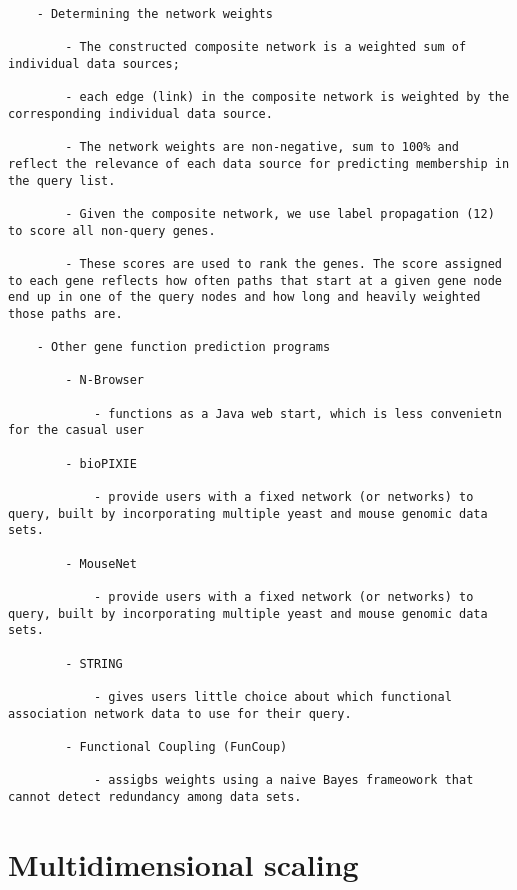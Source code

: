 \documentclass[
]{book}
\begin{document}
\begin{verbatim}
    - Determining the network weights

        - The constructed composite network is a weighted sum of individual data sources;

        - each edge (link) in the composite network is weighted by the corresponding individual data source.

        - The network weights are non-negative, sum to 100% and reflect the relevance of each data source for predicting membership in the query list.

        - Given the composite network, we use label propagation (12) to score all non-query genes.

        - These scores are used to rank the genes. The score assigned to each gene reflects how often paths that start at a given gene node end up in one of the query nodes and how long and heavily weighted those paths are.

    - Other gene function prediction programs

        - N-Browser

            - functions as a Java web start, which is less convenietn for the casual user

        - bioPIXIE

            - provide users with a fixed network (or networks) to query, built by incorporating multiple yeast and mouse genomic data sets.

        - MouseNet

            - provide users with a fixed network (or networks) to query, built by incorporating multiple yeast and mouse genomic data sets.

        - STRING

            - gives users little choice about which functional association network data to use for their query.

        - Functional Coupling (FunCoup)

            - assigbs weights using a naive Bayes frameowork that cannot detect redundancy among data sets.
\end{verbatim}

\hypertarget{multidimensional-scaling}{%
\section{Multidimensional scaling}\label{multidimensional-scaling}}
\end{document}
